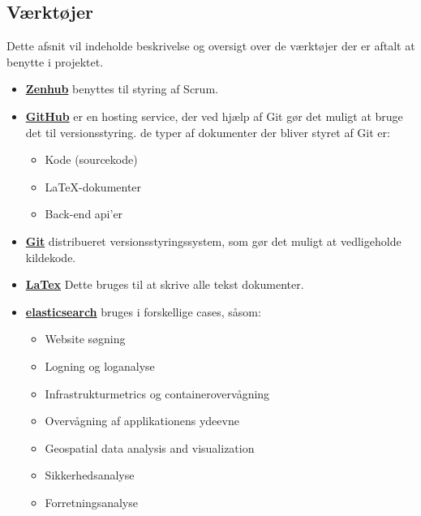 \subsection{Værktøjer}
Dette afsnit vil indeholde beskrivelse og oversigt over de værktøjer der er aftalt at benytte i projektet.

\begin{itemize}
    \item \underline{\textbf{Zenhub}} benyttes til styring af Scrum.
    \item \underline{\textbf{GitHub}} er en hosting service, der ved hjælp af Git gør det muligt at bruge det til versionsstyring. de typer af dokumenter der bliver styret af Git er:
    \begin{itemize}
		\item Kode (sourcekode)
		\item LaTeX-dokumenter
		\item Back-end api'er
	\end{itemize} 
    \item \underline{\textbf{ Git}} distribueret versionsstyringssystem, som gør det muligt at vedligeholde kildekode. 
    \item \underline{\textbf{LaTex}} Dette bruges til at skrive alle tekst dokumenter.
    \item \underline{\textbf{elasticsearch}} bruges i forskellige cases, såsom:
    \begin{itemize}
       \item  Website søgning
       \item  Logning og loganalyse
       \item  Infrastrukturmetrics og containerovervågning
       \item  Overvågning af applikationens ydeevne
       \item Geospatial data analysis and visualization
       \item Sikkerhedsanalyse
       \item Forretningsanalyse
        
    \end{itemize}
   

\end{itemize}
